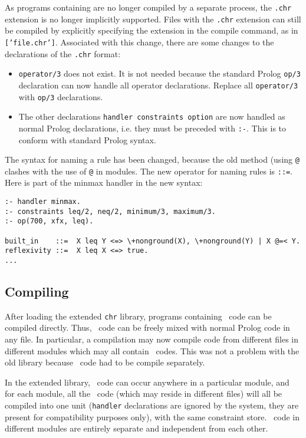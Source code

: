 As programs containing {\chrs} are no longer compiled by a separate process, 
the {\tt .chr} extension is no longer implicitly supported. Files with
the {\tt .chr} extension can still be compiled by explicitly specifying 
the extension in the compile command, as in {\tt ['file.chr']}. Associated
with this change, there are some changes to the declarations of the {\tt .chr}
format:

\begin{itemize}
\item {\tt operator/3} does not exist. It is not needed because the
standard Prolog {\tt op/3} declaration can now handle all operator 
declarations. Replace all {\tt operator/3} with {\tt op/3} declarations.
\item The other declarations {\tt handler constraints option} are now handled
as normal Prolog declarations, i.e. they must be preceded with 
{\tt :-}. This is to conform with standard Prolog syntax.
\end{itemize}

The syntax for naming a rule has been changed, because the old method (using
{\tt @} clashes with the use of {\tt @} in modules. The new operator
for naming rules is {\tt ::=}. Here is part of the minmax handler in the
new syntax:

\begin{verbatim}
:- handler minmax.
:- constraints leq/2, neq/2, minimum/3, maximum/3.
:- op(700, xfx, leq).

built_in    ::=  X leq Y <=> \+nonground(X), \+nonground(Y) | X @=< Y.
reflexivity ::=  X leq X <=> true.
...
\end{verbatim}
 
\subsection{Compiling}

After loading the extended {\tt chr} library, programs containing \chr\  code can
be compiled directly. Thus, \chr\  code can be freely mixed with normal Prolog
code in any file. In particular, a compilation may now compile code from 
different files in different modules which may all contain \chr\  codes. This
was not a problem with the old library because \chr\  code had to be compile
separately. 

In the extended library, \chr\  code can occur anywhere in a particular module, and
for each module, all the \chr\  code (which may reside in different files)
will all be compiled into one unit ({\tt handler} declarations are ignored
by the system, they are present for compatibility purposes only), with the
same constraint store. \chr\  code in different modules are entirely 
separate and independent from each other. 

